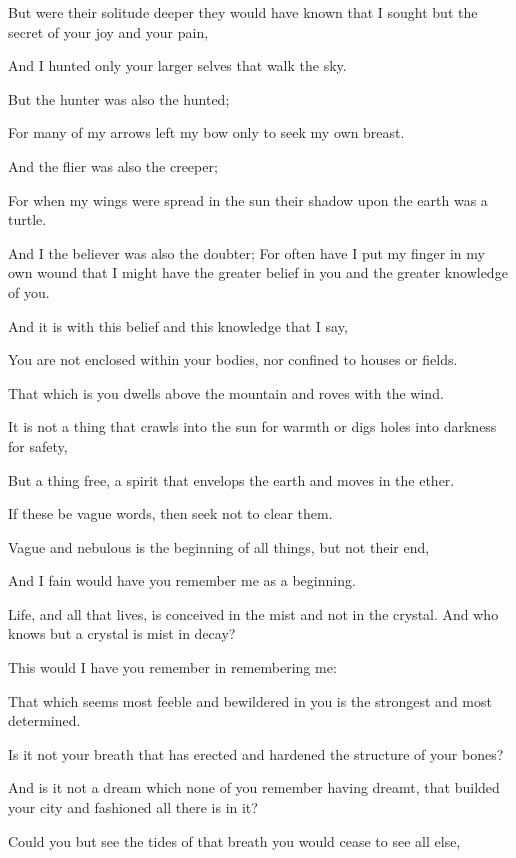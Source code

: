 But were their solitude deeper they
would have known that I sought but the
secret of your joy and your pain,

And I hunted only your larger selves
that walk the sky.



But the hunter was also the hunted;

For many of my arrows left my bow only
to seek my own breast.

And the flier was also the creeper;

For when my wings were spread in the
sun their shadow upon the earth was a
turtle.

And I the believer was also the doubter;
For often have I put my finger
in my own wound that I might have the
greater belief in you and the greater
knowledge of you.



And it is with this belief and this
knowledge that I say,

You are not enclosed within your bodies,
nor confined to houses or fields.

That which is you dwells above the
mountain and roves with the wind.

It is not a thing that crawls into
the sun for warmth or digs holes into
darkness for safety,

But a thing free, a spirit that envelops
the earth and moves in the ether.

If these be vague words, then seek not
to clear them.

Vague and nebulous is the beginning of
all things, but not their end,

And I fain would have you remember me as
a beginning.

Life, and all that lives, is conceived
in the mist and not in the crystal.
And who knows but a crystal is mist
in decay?



This would I have you remember in
remembering me:

That which seems most feeble and
bewildered in you is the strongest and
most determined.

Is it not your breath that has erected
and hardened the structure of your
bones?

And is it not a dream which none of you
remember having dreamt, that builded
your city and fashioned all there is in
it?

Could you but see the tides of that
breath you would cease to see all else,

